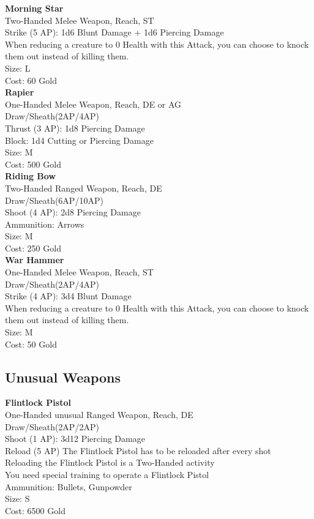 \textbf{Morning Star}\label{weapon:morningStar}\\
Two-Handed Melee Weapon,  Reach, ST\\
Strike (5 AP): 1d6 Blunt Damage + 1d6 Piercing Damage\\
When reducing a creature to 0 Health with this Attack, you can choose to knock them out instead of killing them.\\
Size: L\\
Cost: 60 Gold\\

\textbf{Rapier}\label{weapon:rapier}\\
One-Handed Melee Weapon,  Reach, DE or AG\\
Draw/Sheath(2AP/4AP)\\
Thrust (3 AP): 1d8 Piercing Damage\\
Block: 1d4 Cutting or Piercing Damage\\
Size: M\\
Cost: 500 Gold\\

\textbf{Riding Bow}\label{weapon:ridingBow}\\
Two-Handed Ranged Weapon,  Reach, DE\\
Draw/Sheath(6AP/10AP)\\
Shoot (4 AP): 2d8 Piercing Damage\\
Ammunition: Arrows\\
Size: M\\
Cost: 250 Gold\\

\textbf{War Hammer}\label{weapon:warHammer}\\
One-Handed Melee Weapon,  Reach, ST\\
Draw/Sheath(2AP/4AP)\\
Strike (4 AP): 3d4 Blunt Damage\\
When reducing a creature to 0 Health with this Attack, you can choose to knock them out instead of killing them.\\
Size: M\\
Cost: 50 Gold\\

\subsection{Unusual Weapons}\label{subsec:unusualWeapons}
\textbf{Flintlock Pistol}\label{weapon:flintlockPistol}\\
One-Handed unusual Ranged Weapon,  Reach, DE\\
Draw/Sheath(2AP/2AP)\\
Shoot (1 AP): 3d12 Piercing Damage\\
Reload (5 AP) The Flintlock Pistol has to be reloaded after every shot\\
Reloading the Flintlock Pistol is a Two-Handed activity\\
You need special training to operate a Flintlock Pistol\\
Ammunition: Bullets, Gunpowder\\
Size: S\\
Cost: 6500 Gold\\

